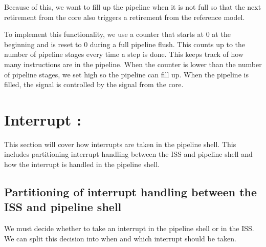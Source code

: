 Because of this, we want to fill up the pipeline when it is not full so that the next retirement from the core also triggers a retirement from the reference model.

To implement this functionality, we use a  counter that starts at 0 at the beginning and is reset to 0 during a full pipeline flush. This counts up to the number of pipeline stages every time a step is done. This keeps track of how many instructions are in the pipeline. When the counter is lower than the number of pipeline stages, we set  high so the pipeline can fill up. When the pipeline is filled, the  signal is controlled by the  signal from the core. 
%
%




\section{Interrupt : }
\label{sec:ps_interrupt}

This section will cover how interrupts are taken in the pipeline shell. This includes partitioning interrupt handling between the ISS and pipeline shell and how the interrupt is handled in the pipeline shell.  

\subsection{Partitioning of interrupt handling between the ISS and pipeline shell}

We must decide whether to take an interrupt in the pipeline shell or in the ISS. We can split this decision into when and which interrupt should be taken.

